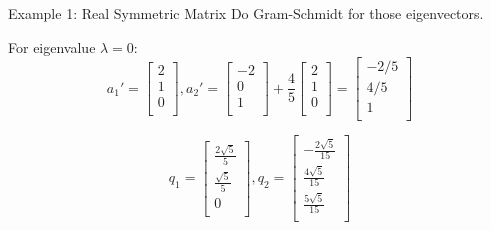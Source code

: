 \documentclass{beamer}
\begin{document}
\begin{frame}{Example 1: Real Symmetric Matrix}
Do Gram-Schmidt for those eigenvectors.

\vspace{3pt}
For eigenvalue $\lambda=0$:
\begin{equation*}
    a_1'=\left[ \begin{array}{c}
        2\\
        1\\
        0\\
    \end{array} \right] , a_2'=\left[ \begin{array}{c}
        -2\\
        0\\
        1\\
    \end{array} \right] +\frac{4}{5}\left[ \begin{array}{c}
        2\\
        1\\
        0\\
    \end{array} \right] =\left[ \begin{array}{c}
        -2/5\\
        4/5\\
        1\\
    \end{array} \right]
\end{equation*}

\begin{equation*}
    q_1=\left[ \begin{array}{c}
        \frac{2\sqrt{5}}{5}\\
        \frac{\sqrt{5}}{5}\\
        0\\
    \end{array} \right] , q_2=\left[ \begin{array}{c}
        -\frac{2\sqrt{5}}{15}\\
        \frac{4\sqrt{5}}{15}\\
        \frac{5\sqrt{5}}{15}\\
    \end{array} \right]
\end{equation*}
\end{frame}
\end{document}
